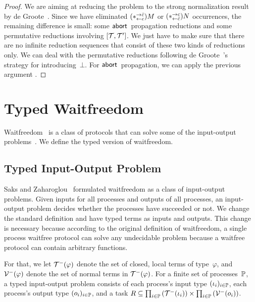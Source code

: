 {\begin{proof}
We are aiming at reducing the problem to the strong normalization result
by de Groote~\cite{Philippe2002js}.
Since we have eliminated $(\ast^{\rightarrow {\bar{c}}}_{\leftarrow{c}})M$ or $(\ast^{\rightarrow {c}}_{\leftarrow{\bar{c}}})N$ occurrences,
the remaining difference is small: some $\mathsf{abort\,}$ propagation reductions
 and some permutative reductions involving $[{\mathcal{T},\mathcal{T}'}]$.
We just have to make sure that there are no infinite reduction sequences
that consist of these two kinds of reductions only.
We can deal with the permutative reductions following de
 Groote~\cite{Philippe2002js}'s strategy for introducing~$\bot$.
For $\mathsf{abort\,}$ propagation, we can apply the previous argument .
\end{proof}

\section{Typed Waitfreedom}
\label{waitfreedom}

Waitfreedom~\cite{Herlihy88,Saks:1993vq} is a class of protocols
that can solve
some of the input-output problems~\cite{Moran:1987ep,Biran:1988hh}.
We define the typed version of waitfreedom.

\subsection{Typed Input-Output Problem}

Saks and Zaharoglou~\cite{Saks:1993vq} formulated waitfreedom as a class
of input-output
problems.
Given inputs for all processes and outputs of all
processes, an input-output problem decides whether the processes have
succeeded or not.
We change the standard definition and have typed terms as inputs and
outputs.
This change is necessary because according to the original definition of
waitfreedom,
a single process waitfree protocol can solve any undecidable problem
because a waitfree protocol can contain arbitrary functions.

For that, we let $\mathcal{T}^-(\varphi)$ denote the set of closed, local terms of
type~$\varphi$,
and $\mathcal{V}^-(\varphi)$ denote the set of normal terms in $\mathcal{T}^-(\varphi)$.
For a finite set of processes~$\mathbb{P}$,
a typed input-output problem consists of each process's input type
$(\iota_i)_{i\in \mathbb{P}}$, each process's output type $(o_i)_{i\in
\mathbb{P}}$, and a
task $R\subseteq \prod_{i\in \mathbb{P}}\left(\mathcal{T}^-(\iota_i)\right)\times
 \prod_{i\in \mathbb{P}}\left(\mathcal{V}^-(o_i)\right)$.

}
